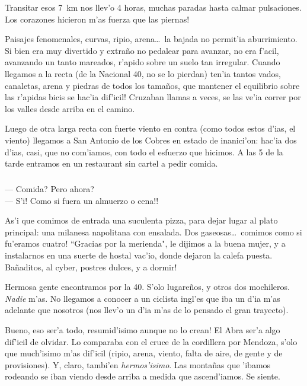 Transitar esos 7~km nos llev'o 4 horas, muchas paradas hasta calmar pulsaciones.
\textexclamdown Los corazones hicieron m'as fuerza que las piernas!

Paisajes fenomenales, curvas, ripio, arena\ldots\ la bajada no permit'ia
aburrimiento. Si bien era muy divertido y extra\~no no pedalear para avanzar, no
era f'acil, avanzando un tanto mareados, r'apido sobre un suelo tan irregular.
Cuando llegamos a la recta (de la Nacional 40, no se lo pierdan) \textexclamdown
ten'ia tantos vados, canaletas, arena y piedras de todos los tama\~nos,
\textexclamdown que mantener el equilibrio sobre las r'apidas bicis se hac'ia
dif'icil! Cruzaban llamas a veces, se las ve'ia correr por los valles desde
arriba en el camino.

Luego de otra larga recta con fuerte viento en contra (como todos estos d'ias,
el viento) llegamos a San Antonio de los Cobres en estado de inanici'on: hac'ia
dos d'ias, casi, que no com'iamos, con todo el esfuerzo que hicimos. A las 5 de
la tarde entramos en un restaurant sin cartel a pedir comida.

\subparagraph{}\label{ssub:comerAhora} --- \textquestiondown Comida?
\textquestiondown Pero ahora? \\ --- \textexclamdown S'i! \textexclamdown
\textexclamdown Como si fuera un almuerzo o cena!!\\ \hangindent=1cm

As'i que comimos de entrada una suculenta pizza, para dejar lugar al plato
principal: una milanesa napolitana con ensalada. Dos gaseosas\ldots\
\textexclamdown comimos como si fu'eramos cuatro! ``Gracias por la merienda", le
dijimos a la buena mujer, y a instalarnos en una suerte de hostal vac'io, donde
dejaron la calefa puesta. Ba\~naditos, al cyber, postres dulces, \textexclamdown
y a dormir!

Hermosa gente encontramos por la 40. S'olo lugare\~nos, y otros dos mochileros.
\emph{Nadie} m'as. No llegamos a conocer a un ciclista ingl'es que iba un d'ia
m'as adelante que nosotros (nos llev'o un d'ia m'as de lo pensado el gran
trayecto).

\textexclamdown Bueno, eso ser'a todo, resumid'isimo aunque no lo crean! El Abra
ser'a algo dif'icil de olvidar. Lo comparaba con el cruce de la cordillera por
Mendoza, s'olo que much'isimo m'as dif'icil (ripio, arena, viento, falta de
aire, de gente y de provisiones). Y, claro, tambi'en \emph{hermos'isimo}. Las
monta\~nas que 'ibamos rodeando se iban viendo desde arriba a medida que
ascend'iamos. Se siente.

